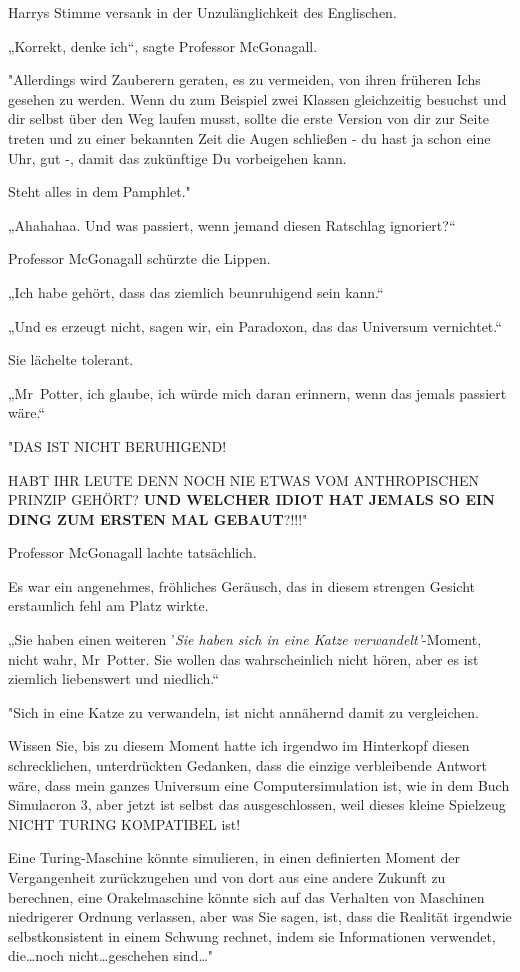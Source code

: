 {Harrys Stimme versank in der Unzulänglichkeit des Englischen.

„Korrekt, denke ich“, sagte Professor McGonagall.

"Allerdings wird Zauberern geraten, es zu vermeiden, von ihren früheren Ichs gesehen zu werden. Wenn du zum Beispiel zwei Klassen gleichzeitig besuchst und dir selbst über den Weg laufen musst, sollte die erste Version von dir zur Seite treten und zu einer bekannten Zeit die Augen schließen - du hast ja schon eine Uhr, gut -, damit das zukünftige Du vorbeigehen kann.

Steht alles in dem Pamphlet."

„Ahahahaa. Und was passiert, wenn jemand diesen Ratschlag ignoriert?“

Professor McGonagall schürzte die Lippen.

„Ich habe gehört, dass das ziemlich beunruhigend sein kann.“

„Und es erzeugt nicht, sagen wir, ein Paradoxon, das das Universum vernichtet.“

Sie lächelte tolerant.

„Mr~Potter, ich glaube, ich würde mich daran erinnern, wenn das jemals passiert wäre.“

"DAS IST NICHT BERUHIGEND!

HABT IHR LEUTE DENN NOCH NIE ETWAS VOM ANTHROPISCHEN PRINZIP GEHÖRT? \textbf{UND WELCHER IDIOT HAT JEMALS SO EIN DING ZUM ERSTEN MAL GEBAUT}?!!!"

Professor McGonagall lachte tatsächlich.

Es war ein angenehmes, fröhliches Geräusch, das in diesem strengen Gesicht erstaunlich fehl am Platz wirkte.

„Sie haben einen weiteren '\emph{Sie haben sich in eine Katze verwandelt'}-Moment, nicht wahr, Mr~Potter. Sie wollen das wahrscheinlich nicht hören, aber es ist ziemlich liebenswert und niedlich.“

"Sich in eine Katze zu verwandeln, ist nicht annähernd damit zu vergleichen.

Wissen Sie, bis zu diesem Moment hatte ich irgendwo im Hinterkopf diesen schrecklichen, unterdrückten Gedanken, dass die einzige verbleibende Antwort wäre, dass mein ganzes Universum eine Computersimulation ist, wie in dem Buch Simulacron 3, aber jetzt ist selbst das ausgeschlossen, weil dieses kleine Spielzeug NICHT TURING KOMPATIBEL ist!

Eine Turing-Maschine könnte simulieren, in einen definierten Moment der Vergangenheit zurückzugehen und von dort aus eine andere Zukunft zu berechnen, eine Orakelmaschine könnte sich auf das Verhalten von Maschinen niedrigerer Ordnung verlassen, aber was Sie sagen, ist, dass die Realität irgendwie selbstkonsistent in einem Schwung rechnet, indem sie Informationen verwendet, die…noch nicht…geschehen sind…"

}
